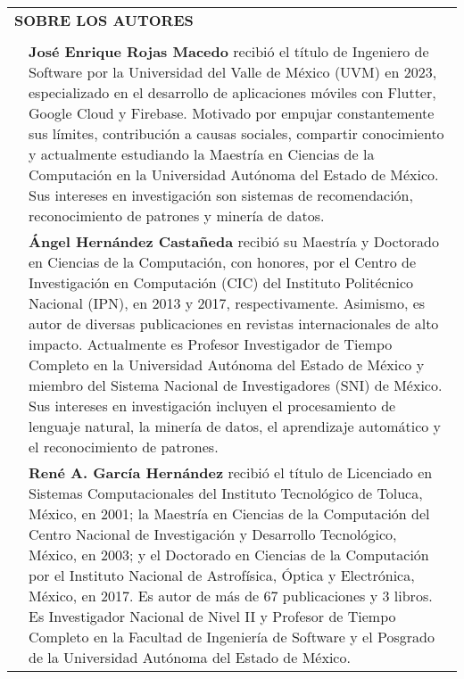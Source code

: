 \documentclass[letterpaper,10pt,final,hyphenatedtitles]{papertexKS}
\begin{document}
\begin{tabular}{p{}p{}}
	\multicolumn{2}{l}{\textcolor{color}{\textbf{SOBRE LOS AUTORES}}} \\
	                                            &                     \\
	\noindent
	\begin{minipage}[tc]{0.1\columnwidth}
		\image{images/authors/enriquerojas.png}{}
	\end{minipage}   &
	\begin{minipage}[tc]{0.86\columnwidth}
		\textcolor{color}{\textbf{José Enrique Rojas Macedo}} recibió el título de Ingeniero de Software por la Universidad del Valle de México (UVM) en 2023, especializado en el desarrollo de aplicaciones móviles con Flutter, Google Cloud y Firebase. Motivado por empujar constantemente sus límites, contribución a causas sociales, compartir conocimiento y actualmente estudiando la Maestría en Ciencias de la Computación en la Universidad Autónoma del Estado de México. Sus intereses en investigación son sistemas de recomendación, reconocimiento de patrones y minería de datos.
	\end{minipage}
	\\
	\begin{minipage}[tc]{0.1\columnwidth}
		\image{images/authors/angelhernandez.png}{}
	\end{minipage} &
	\begin{minipage}[tc]{0.86\columnwidth}
		\textcolor{color}{\textbf{Ángel Hernández Castañeda}} recibió su Maestría y Doctorado en Ciencias de la Computación, con honores, por el Centro de Investigación en Computación (CIC) del Instituto Politécnico Nacional (IPN), en 2013 y 2017, respectivamente. Asimismo, es autor de diversas publicaciones en revistas internacionales de alto impacto. Actualmente es Profesor Investigador de Tiempo Completo en la Universidad Autónoma del Estado de México y miembro del Sistema Nacional de Investigadores (SNI) de México. Sus intereses en investigación incluyen el procesamiento de lenguaje natural, la minería de datos, el aprendizaje automático y el reconocimiento de patrones.
	\end{minipage}
	\\
	\begin{minipage}[tc]{0.1\columnwidth}
		\image{images/authors/renegarcia.png}{}
	\end{minipage} &
	\begin{minipage}[tc]{0.86\columnwidth}
		\textcolor{color}{\textbf{René A. García Hernández}} recibió el título de Licenciado en Sistemas Computacionales del Instituto Tecnológico de Toluca, México, en 2001; la Maestría en Ciencias de la Computación del Centro Nacional de Investigación y Desarrollo Tecnológico, México, en 2003; y el Doctorado en Ciencias de la Computación por el Instituto Nacional de Astrofísica, Óptica y Electrónica, México, en 2017. Es autor de más de 67 publicaciones y 3 libros. Es Investigador Nacional de Nivel II y Profesor de Tiempo Completo en la Facultad de Ingeniería de Software y el Posgrado de la Universidad Autónoma del Estado de México.

\end{minipage}
\end{tabular}
\end{document}
